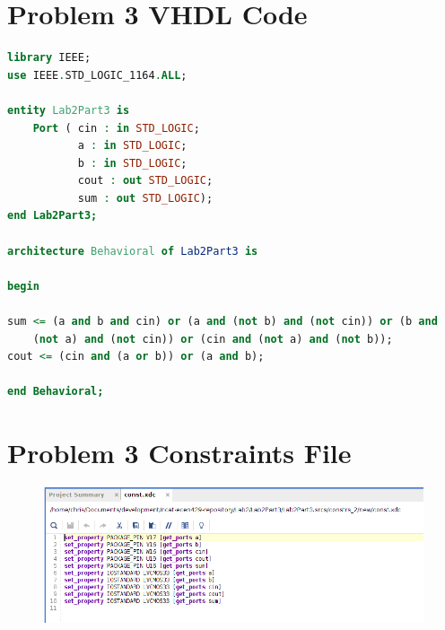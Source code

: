 \documentclass[11pt]{article}
\begin{document}
\begin{appendices}
	\section{Problem 3 VHDL Code}
	
	\begin{lstlisting}[language=VHDL]
library IEEE;
use IEEE.STD_LOGIC_1164.ALL;

entity Lab2Part3 is
    Port ( cin : in STD_LOGIC;
           a : in STD_LOGIC;
           b : in STD_LOGIC;
           cout : out STD_LOGIC;
           sum : out STD_LOGIC);
end Lab2Part3;

architecture Behavioral of Lab2Part3 is

begin

sum <= (a and b and cin) or (a and (not b) and (not cin)) or (b and 
	(not a) and (not cin)) or (cin and (not a) and (not b));
cout <= (cin and (a or b)) or (a and b);

end Behavioral;
	\end{lstlisting}
	
	\section{Problem 3 Constraints File}
	
	\begin{figure}[h]
	\includegraphics[width=\textwidth]{report-images/img7}
	\end{figure}
	
\end{appendices}
\end{document}
